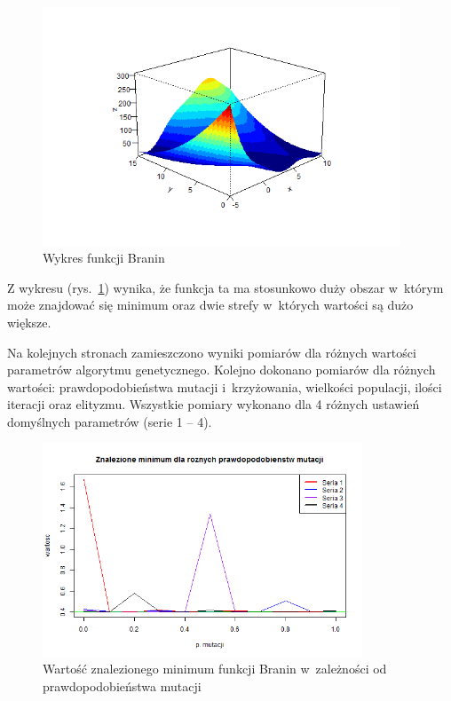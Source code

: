 \documentclass[11pt, a4paper]{article}
\newcommand{\fbi}{\leavevmode{\parindent=1em\indent}}
\begin{document}
\begin{figure}[H]
	\centering
	\includegraphics[width=0.95\textwidth]{./assets/Branin1.png}
	\caption{Wykres funkcji Branin}
	\label{fig:branin1}
\end{figure}

\fbi
Z wykresu (rys.~\ref{fig:branin1}) wynika, że funkcja ta ma stosunkowo duży obszar w~którym może znajdować się minimum oraz dwie strefy w~których wartości są dużo większe.

\fbi
Na kolejnych stronach zamieszczono wyniki pomiarów dla różnych wartości parametrów algorytmu genetycznego. Kolejno dokonano pomiarów dla różnych wartości: prawdopodobieństwa mutacji i~krzyżowania, wielkości populacji, ilości iteracji oraz elityzmu. Wszystkie pomiary wykonano dla 4 różnych ustawień domyślnych parametrów (serie 1 -- 4).

\newpage
\begin{figure}[H]
	\centering
	\includegraphics[width=0.85\textwidth]{./assets/Branin2.png}
	\caption{Wartość znalezionego minimum funkcji Branin w~zależności od prawdopodobieństwa mutacji}
	\label{fig:branin2}
\end{figure}
\end{document}
